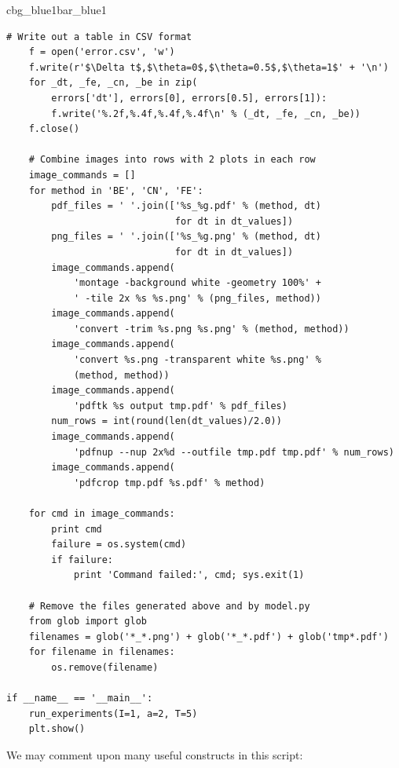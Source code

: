 \documentclass[%
oneside,                 %
final,                   %
10pt]{article}
\newenvironment{_pro_tight}[2]{
   \def\FrameCommand{\color{#2}\vrule width 1mm\normalcolor\colorbox{#1}}
   \FrameRule0.6pt\MakeFramed {\advance\hsize-2mm\FrameRestore}\vskip3mm}
   {\vskip0mm\endMakeFramed}
\newenvironment{pro}[2]{
\bgroup\rmfamily
\fboxsep=0mm\relax
\begin{_pro_tight}{#1}{#2}
\list{}{\parsep=-2mm\parskip=0mm\topsep=0pt\leftmargin=2mm
\rightmargin=2\leftmargin\leftmargin=4pt\relax}
\item\relax}
{\endlist\end{_pro_tight}\egroup}
\begin{document}
\begin{pro}{cbg_blue1}{bar_blue1}
\begin{Verbatim}[numbers=none,fontsize=\fontsize{9pt}{9pt},baselinestretch=0.95,xleftmargin=2mm]
    # Write out a table in CSV format
    f = open('error.csv', 'w')
    f.write(r'$\Delta t$,$\theta=0$,$\theta=0.5$,$\theta=1$' + '\n')
    for _dt, _fe, _cn, _be in zip(
        errors['dt'], errors[0], errors[0.5], errors[1]):
        f.write('%.2f,%.4f,%.4f,%.4f\n' % (_dt, _fe, _cn, _be))
    f.close()

    # Combine images into rows with 2 plots in each row
    image_commands = []
    for method in 'BE', 'CN', 'FE':
        pdf_files = ' '.join(['%s_%g.pdf' % (method, dt)
                              for dt in dt_values])
        png_files = ' '.join(['%s_%g.png' % (method, dt)
                              for dt in dt_values])
        image_commands.append(
            'montage -background white -geometry 100%' +
            ' -tile 2x %s %s.png' % (png_files, method))
        image_commands.append(
            'convert -trim %s.png %s.png' % (method, method))
        image_commands.append(
            'convert %s.png -transparent white %s.png' %
            (method, method))
        image_commands.append(
            'pdftk %s output tmp.pdf' % pdf_files)
        num_rows = int(round(len(dt_values)/2.0))
        image_commands.append(
            'pdfnup --nup 2x%d --outfile tmp.pdf tmp.pdf' % num_rows)
        image_commands.append(
            'pdfcrop tmp.pdf %s.pdf' % method)

    for cmd in image_commands:
        print cmd
        failure = os.system(cmd)
        if failure:
            print 'Command failed:', cmd; sys.exit(1)

    # Remove the files generated above and by model.py
    from glob import glob
    filenames = glob('*_*.png') + glob('*_*.pdf') + glob('tmp*.pdf')
    for filename in filenames:
        os.remove(filename)

if __name__ == '__main__':
    run_experiments(I=1, a=2, T=5)
    plt.show()
\end{Verbatim}
\end{pro}
\noindent

 

We may comment upon many useful constructs in this script:
\end{document}
